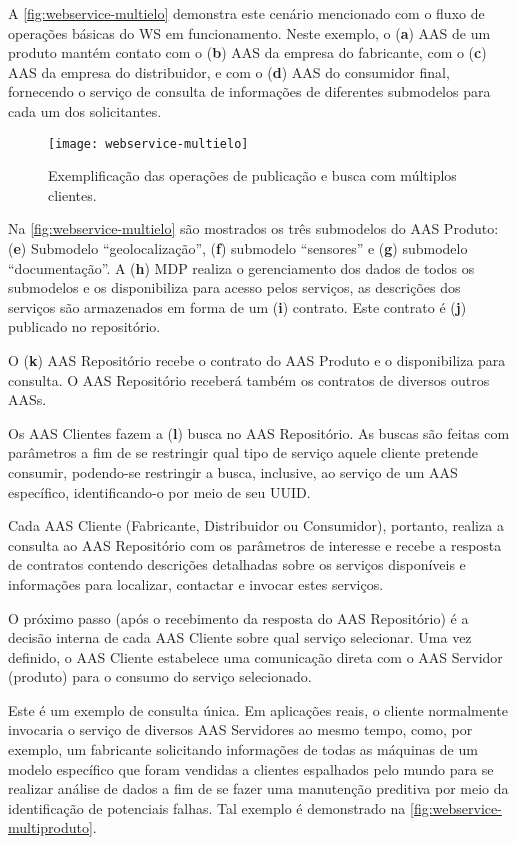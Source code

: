 	A \autoref{fig:webservice-multielo} demonstra este cenário mencionado com o fluxo de operações básicas do WS em funcionamento. Neste exemplo, o (\textbf{a}) AAS de um produto mantém contato com o (\textbf{b}) AAS da empresa do fabricante, com o (\textbf{c}) AAS da empresa do distribuidor, e com o (\textbf{d}) AAS do consumidor final, fornecendo o serviço de consulta de informações de diferentes submodelos para cada um dos solicitantes.
	
	\begin{figure}[htb]
		\centering
		\label{fig:webservice-multielo}
		\texttt{[image: webservice-multielo]}
		\caption{Exemplificação das operações de publicação e busca com múltiplos clientes.}
	\end{figure}

	Na \autoref{fig:webservice-multielo} são mostrados os três submodelos do AAS Produto: (\textbf{e}) Submodelo ``geolocalização'', (\textbf{f}) submodelo ``sensores'' e (\textbf{g}) submodelo ``documentação''. A (\textbf{h}) MDP realiza o gerenciamento dos dados de todos os submodelos e os disponibiliza para acesso pelos serviços, as descrições dos serviços são armazenados em forma de um (\textbf{i}) contrato. Este contrato é (\textbf{j}) publicado no repositório.
	
	O (\textbf{k}) AAS Repositório recebe o contrato do AAS Produto e o disponibiliza para consulta. O AAS Repositório receberá também os contratos de diversos outros AASs.
	
	Os AAS Clientes fazem a (\textbf{l}) busca no AAS Repositório. As buscas são feitas com parâmetros a fim de se restringir qual tipo de serviço aquele cliente pretende consumir, podendo-se restringir a busca, inclusive, ao serviço de um AAS específico, identificando-o por meio de seu UUID.
	
	Cada AAS Cliente (Fabricante, Distribuidor ou Consumidor), portanto, realiza a consulta ao AAS Repositório com os parâmetros de interesse e recebe a resposta de contratos contendo descrições detalhadas sobre os serviços disponíveis e informações para localizar, contactar e invocar estes serviços.
	
	O próximo passo (após o recebimento da resposta do AAS Repositório) é a decisão interna de cada AAS Cliente sobre qual serviço selecionar. Uma vez definido, o AAS Cliente estabelece uma comunicação direta com o AAS Servidor (produto) para o consumo do serviço selecionado.
	
	Este é um exemplo de consulta única. Em aplicações reais, o cliente normalmente invocaria o serviço de diversos AAS Servidores ao mesmo tempo, como, por exemplo, um fabricante solicitando informações de todas as máquinas de um modelo específico que foram vendidas a clientes espalhados pelo mundo para se realizar análise de dados a fim de se fazer uma manutenção preditiva por meio da identificação de potenciais falhas. Tal exemplo é demonstrado na \autoref{fig:webservice-multiproduto}.
	
